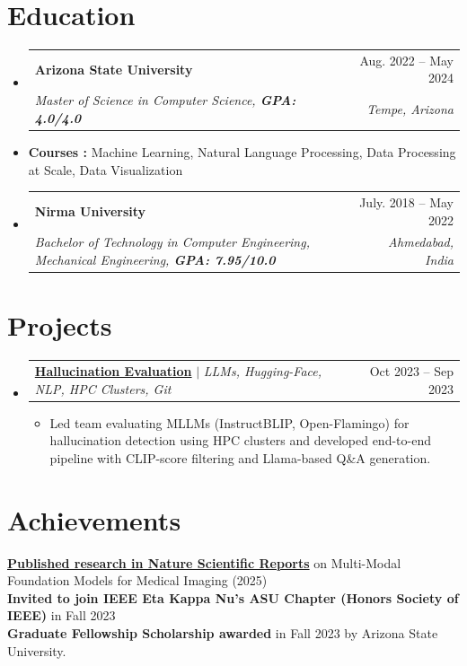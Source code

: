 \documentclass[letterpaper,10.6pt]{article}
\makeatletter
\newcommand{\resumeItem}[1]{
  \item\small{
    {#1 \vspace{-2.5pt}}
  }
}
\newcommand{\resumeSubheading}[4]{
  \vspace{-2.5pt}\item
    \begin{tabular*}{0.97\textwidth}[t]{l@{\extracolsep{\fill}}r}
      \textbf{#1} & #2 \\
      \textit{\small#3} & \textit{\small #4} \\
    \end{tabular*}\vspace{-7pt}
}
\newcommand{\resumeProjectHeading}[2]{
    \item
    \begin{tabular*}{0.97\textwidth}{l@{\extracolsep{\fill}}r}
      \small#1 & #2 \\
    \end{tabular*}\vspace{-7pt}
}
\newcommand{\resumeSubHeadingListStart}{\begin{itemize}[leftmargin=0.15in, label={}]}
\newcommand{\resumeSubHeadingListEnd}{\end{itemize}\vspace{-7pt}}
\newcommand{\resumeItemListStart}{\begin{itemize}}
\newcommand{\resumeItemListEnd}{\end{itemize}\vspace{-6pt}}
\makeatother
\begin{document}
\section{Education}
  \resumeSubHeadingListStart
 \resumeSubheading
      {Arizona State University}{Aug. 2022 -- May 2024}
      {Master of Science in Computer Science, \textbf{GPA: 4.0/4.0}} {Tempe, Arizona}
    \resumeItem{\textbf{Courses :} {Machine Learning, Natural Language Processing, Data Processing at Scale, Data Visualization}}
    
    \resumeSubheading
      {Nirma University}{July. 2018 -- May 2022}
      {Bachelor of Technology in Computer Engineering, Mechanical Engineering, \textbf{GPA: 7.95/10.0}}{Ahmedabad, India}
  \resumeSubHeadingListEnd
\vspace{4pt}
\section{Projects}
    \resumeSubHeadingListStart
      \resumeProjectHeading
        {\href{https://github.com/devamsheth21/MLLM-hallucination-evaluation} {\textbf{Hallucination Evaluation}} \faGithub $|$ \emph{LLMs, Hugging-Face, NLP, HPC Clusters, Git }}{Oct 2023 -- Sep 2023}
        \resumeItemListStart
            \resumeItem{Led team evaluating MLLMs (InstructBLIP, Open-Flamingo) for hallucination detection using HPC clusters and developed end-to-end pipeline with CLIP-score filtering and Llama-based Q\&A generation.}
        \resumeItemListEnd
    \resumeSubHeadingListEnd

\vspace{4pt}
\section{Achievements}
\begin{itemize}[leftmargin=0.15in, label={}]
    \small{\item{
     \textbf{\href{https://www.nature.com/articles/s41598-025-18507-8}{Published research in Nature Scientific Reports}}{ on Multi-Modal Foundation Models for Medical Imaging (2025)} \\
     \textbf{Invited to join IEEE Eta Kappa Nu's ASU Chapter (Honors Society of IEEE)}{ in Fall 2023 } \\
     \textbf{Graduate Fellowship Scholarship awarded}{ in Fall 2023 by Arizona State University.}
    }}
\end{itemize}

\end{document}
